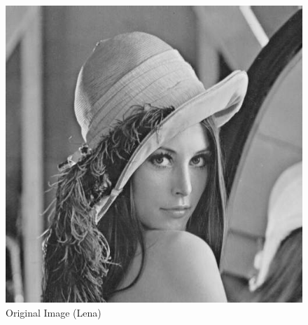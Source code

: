 \documentclass[11pt]{article}
\begin{document}

\begin{figure}[h]
\centering
\includegraphics[width=.5\textwidth]{img.png}
\caption{Original Image (Lena)}
\label{fig:img}
\end{figure}
\end{document}
